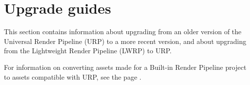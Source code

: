 \chapter{Upgrade guides}
\hypertarget{md__hey_tea_9_2_library_2_package_cache_2com_8unity_8render-pipelines_8universal_0d14_80_88_2_documentation_0i_2upgrade-guides}{}\label{md__hey_tea_9_2_library_2_package_cache_2com_8unity_8render-pipelines_8universal_0d14_80_88_2_documentation_0i_2upgrade-guides}
\label{md__hey_tea_9_2_library_2_package_cache_2com_8unity_8render-pipelines_8universal_0d14_80_88_2_documentation_0i_2upgrade-guides_autotoc_md2622}%
%
 This section contains information about upgrading from an older version of the Universal Render Pipeline (URP) to a more recent version, and about upgrading from the Lightweight Render Pipeline (LWRP) to URP.

For information on converting assets made for a Built-\/in Render Pipeline project to assets compatible with URP, see the page .


